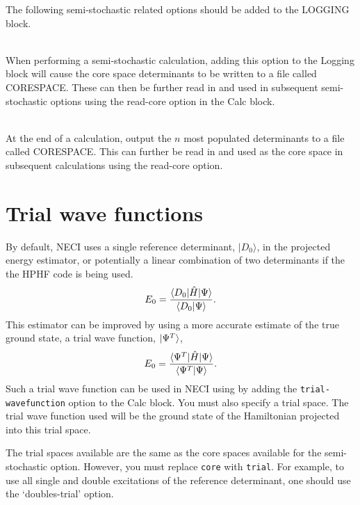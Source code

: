 \documentclass[a4paper,notitlepage]{scrreprt}
\newcommand\codeitem[1]{\needspace{1.5\baselineskip}\item[\textnormal{\ttfamily #1 \nopagebreak}] \hfill \\ \nopagebreak}
\let\code\lstinline
\begin{document}
    The following semi-stochastic related options should be added to the
    LOGGING block.
    \begin{description}
		\codeitem{write-core}
            When performing a semi-stochastic calculation, adding this option
            to the Logging block will cause the core space determinants to be
            written to a file called CORESPACE. These can then be further read
            in and used in subsequent semi-stochastic options using the
            read-core option in the Calc block.
		\codeitem{write-most-pop-core-end $n$}
            At the end of a calculation, output the $n$ most populated
            determinants to a file called CORESPACE. This can further be read
            in and used as the core space in subsequent calculations using the
            read-core option.
    \end{description}

    \section{Trial wave functions}
    \label{sec:trial}

    By default, NECI uses a single reference determinant, $|D_0\rangle$, in the
    projected energy estimator, or potentially a linear combination of two
    determinants if the the HPHF code is being used.
    \begin{equation}
        E_0 = \frac{\braket{D_0 | \hat{H} | \Psi}}{\braket{D_0 | \Psi}}.
    \end{equation}
    This estimator can be improved by using a more accurate estimate of the
    true ground state, a trial wave function, $\ket{\Psi^T}$,
    \begin{equation}
        E_0 = \frac{\braket{\Psi^T | \hat{H} | \Psi}}{\braket{\Psi^T | \Psi}}.
    \end{equation}
    Such a trial wave function can be used in NECI using by adding the
    \code{trial-wavefunction} option to the Calc block.
    You must also specify a
    trial space. The trial wave function used will be the ground state of the
    Hamiltonian projected into this trial space.

    The trial spaces available are the same as the core spaces available for
    the semi-stochastic option. However, you must replace \code{core} with
    \code{trial}. For
    example, to use all single and double excitations of the reference
    determinant, one should use the `doubles-trial' option.
\end{document}
